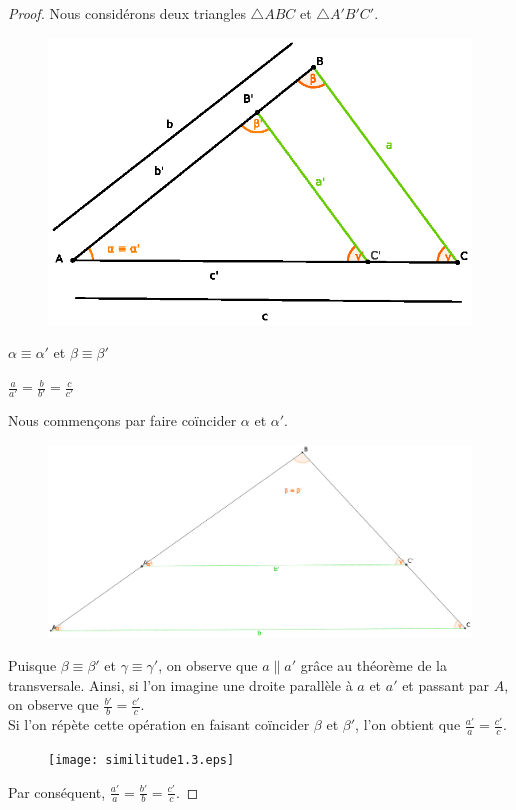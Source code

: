 \documentclass[a4paper,12pt]{article}
\begin{document}
\begin{proof}
Nous considérons deux triangles $\triangle ABC$ et $\triangle A'B'C'$.

\begin{figure}[H]
        \centering
        \includegraphics[scale=0.2]{similitude1.1.eps}
    \end{figure}

\begin{hyp}
$\alpha \equiv \alpha'$ et $\beta \equiv \beta'$
\end{hyp}

\begin{concl}
$\frac{a}{a'} = \frac{b}{b'} = \frac{c}{c'}$
\end{concl}

Nous commençons par faire coïncider $\alpha$ et $\alpha '$.\\

\begin{figure}[H]
        \centering
        \includegraphics[scale=0.2]{similitude1.2.eps}
    \end{figure}

Puisque $\beta \equiv \beta '$ et $\gamma \equiv \gamma '$, on observe que $a \parallel a'$ grâce au théorème de la transversale.
Ainsi, si l'on imagine une droite parallèle à $a$ et $a'$ et passant par $A$, on observe que $\frac{b'}{b} = \frac{c'}{c}$.\\
Si l'on répète cette opération en faisant coïncider $\beta$ et $\beta '$, l'on obtient que $\frac{a'}{a} = \frac{c'}{c}$.

\begin{figure}[H]
        \centering
        \texttt{[image: similitude1.3.eps]}
    \end{figure}
Par conséquent, $\frac{a'}{a} = \frac{b'}{b} = \frac{c'}{c}$.


\end{proof}
\end{document}
